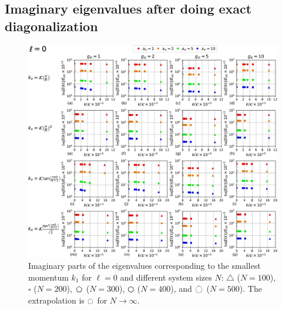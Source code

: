 \documentclass[english,aps,prd,nofootinbib,twocolumn]{revtex4-1}
\newcommand{\largepentagon}{\large{\pentagon}}
\newcommand{\largevarhexagon}{\large{\varhexagon}}
\begin{document}
\subsection{Imaginary eigenvalues after doing exact diagonalization}

\begin{figure}
\centering 
\includegraphics[scale=0.5]{./PlotReport/PlotReportL0.pdf}
\caption{Imaginary parts of the eigenvalues corresponding to the smallest momentum $k_{1}$ for $\ell=0$ and different system sizes $N$: $\triangle$ ($N=100$), $\square$ ($N=200$), $\largepentagon$ ($N=300$), $\largevarhexagon$ ($N=400$), and $\octagon$ ($N=500$). The extrapolation is $\ocircle$ for $N\rightarrow \infty$. }
\label{fig:PlotReportL0}
\end{figure}
\end{document}
